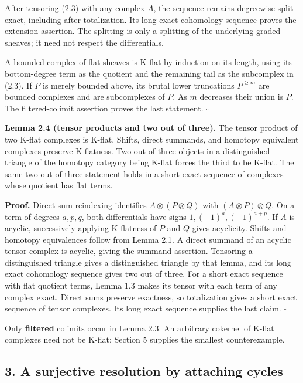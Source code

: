 \documentclass[
  english,
  11pt,
  a4paper,
]{article}
\begin{document}
After tensoring (2.3) with any complex \(A\), the sequence remains
degreewise split exact, including after totalization. Its long exact
cohomology sequence proves the extension assertion. The splitting is
only a splitting of the underlying graded sheaves; it need not respect
the differentials.

A bounded complex of flat sheaves is K-flat by induction on its length,
using its bottom-degree term as the quotient and the remaining tail as
the subcomplex in (2.3). If \(P\) is merely bounded above, its brutal
lower truncations \(P^{\geq m}\) are bounded complexes and are
subcomplexes of \(P\). As \(m\) decreases their union is \(P\). The
filtered-colimit assertion proves the last statement. \(\square\)

\textbf{Lemma 2.4 (tensor products and two out of three).} The tensor
product of two K-flat complexes is K-flat. Shifts, direct summands, and
homotopy equivalent complexes preserve K-flatness. Two out of three
objects in a distinguished triangle of the homotopy category being
K-flat forces the third to be K-flat. The same two-out-of-three
statement holds in a short exact sequence of complexes whose quotient
has flat terms.

\textbf{Proof.} Direct-sum reindexing identifies
\(A\otimes(P\otimes Q)\) with \((A\otimes P)\otimes Q\). On a term of
degrees \(a,p,q\), both differentials have signs
\(1,(-1)^a,(-1)^{a+p}\). If \(A\) is acyclic, successively applying
K-flatness of \(P\) and \(Q\) gives acyclicity. Shifts and homotopy
equivalences follow from Lemma 2.1. A direct summand of an acyclic
tensor complex is acyclic, giving the summand assertion. Tensoring a
distinguished triangle gives a distinguished triangle by that lemma, and
its long exact cohomology sequence gives two out of three. For a short
exact sequence with flat quotient terms, Lemma 1.3 makes its tensor with
each term of any complex exact. Direct sums preserve exactness, so
totalization gives a short exact sequence of tensor complexes. Its long
exact sequence supplies the last claim. \(\square\)

Only \textbf{filtered} colimits occur in Lemma 2.3. An arbitrary
cokernel of K-flat complexes need not be K-flat; Section 5 supplies the
smallest counterexample.

\subsection{3. A surjective resolution by attaching
cycles}\label{flat-modules-and-k-flat-resolutions--3-a-surjective-resolution-by-attaching-cycles}
\end{document}
